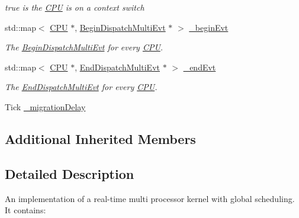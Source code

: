 \begin{DoxyCompactItemize}
\begin{DoxyCompactList}\small\item\em true is the \hyperlink{classRTSim_1_1CPU}{C\+PU} is on a context switch \end{DoxyCompactList}\item 
std\+::map$<$ \hyperlink{classRTSim_1_1CPU}{C\+PU} $\ast$, \hyperlink{classRTSim_1_1BeginDispatchMultiEvt}{Begin\+Dispatch\+Multi\+Evt} $\ast$ $>$ \hyperlink{classRTSim_1_1MRTKernel_af54e9a148f0269a13be7c7950fe0c6ce}{\+\_\+begin\+Evt}\hypertarget{classRTSim_1_1MRTKernel_af54e9a148f0269a13be7c7950fe0c6ce}{}\label{classRTSim_1_1MRTKernel_af54e9a148f0269a13be7c7950fe0c6ce}

\begin{DoxyCompactList}\small\item\em The \hyperlink{classRTSim_1_1BeginDispatchMultiEvt}{Begin\+Dispatch\+Multi\+Evt} for every \hyperlink{classRTSim_1_1CPU}{C\+PU}. \end{DoxyCompactList}\item 
std\+::map$<$ \hyperlink{classRTSim_1_1CPU}{C\+PU} $\ast$, \hyperlink{classRTSim_1_1EndDispatchMultiEvt}{End\+Dispatch\+Multi\+Evt} $\ast$ $>$ \hyperlink{classRTSim_1_1MRTKernel_a692d97c393f0c9e2169f0ecc94371c50}{\+\_\+end\+Evt}\hypertarget{classRTSim_1_1MRTKernel_a692d97c393f0c9e2169f0ecc94371c50}{}\label{classRTSim_1_1MRTKernel_a692d97c393f0c9e2169f0ecc94371c50}

\begin{DoxyCompactList}\small\item\em The \hyperlink{classRTSim_1_1EndDispatchMultiEvt}{End\+Dispatch\+Multi\+Evt} for every \hyperlink{classRTSim_1_1CPU}{C\+PU}. \end{DoxyCompactList}\item 
Tick \hyperlink{classRTSim_1_1MRTKernel_ab54d11942b5876bbc20a860d4ab8e5f3}{\+\_\+migration\+Delay}
\end{DoxyCompactItemize}
\subsection*{Additional Inherited Members}


\subsection{Detailed Description}
An implementation of a real-\/time multi processor kernel with global scheduling. It contains\+:


